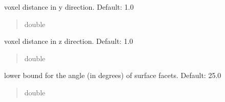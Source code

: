 \documentclass[letterpaper,10pt,english]{sphinxmanual}
\begin{document}
\begin{fulllineitems}

\begin{fulllineitems}
\label{\detokenize{_autosummary/nirfasterff.utils.MeshingParams:nirfasterff.utils.MeshingParams.yPixelSpacing}}
\pysigstartsignatures
{}
\pysigstopsignatures
\sphinxAtStartPar
voxel distance in y direction. Default: 1.0
\begin{quote}\begin{description}
\sphinxAtStartPar
double

\end{description}\end{quote}

\end{fulllineitems}


\begin{fulllineitems}
\label{\detokenize{_autosummary/nirfasterff.utils.MeshingParams:nirfasterff.utils.MeshingParams.SliceThickness}}
\pysigstartsignatures
{}
\pysigstopsignatures
\sphinxAtStartPar
voxel distance in z direction. Default: 1.0
\begin{quote}\begin{description}
\sphinxAtStartPar
double

\end{description}\end{quote}

\end{fulllineitems}


\begin{fulllineitems}
\label{\detokenize{_autosummary/nirfasterff.utils.MeshingParams:nirfasterff.utils.MeshingParams.facet_angle}}
\pysigstartsignatures
{}
\pysigstopsignatures
\sphinxAtStartPar
lower bound for the angle (in degrees) of surface facets. Default: 25.0
\begin{quote}\begin{description}
\sphinxAtStartPar
double


\end{description}
\end{quote}
\end{fulllineitems}
\end{fulllineitems}
\end{document}
